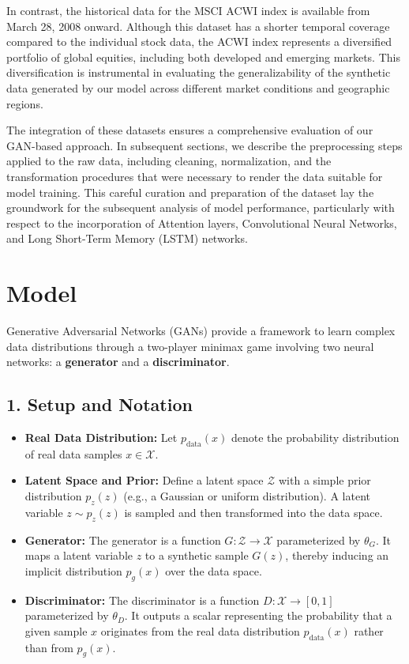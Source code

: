 \documentclass{article}
\begin{document}
In contrast, the historical data for the MSCI ACWI index is available from March 28, 2008 onward. Although this dataset has a shorter temporal coverage compared to the individual stock data, the ACWI index represents a diversified portfolio of global equities, including both developed and emerging markets. This diversification is instrumental in evaluating the generalizability of the synthetic data generated by our model across different market conditions and geographic regions.

The integration of these datasets ensures a comprehensive evaluation of our GAN-based approach. In subsequent sections, we describe the preprocessing steps applied to the raw data, including cleaning, normalization, and the transformation procedures that were necessary to render the data suitable for model training. This careful curation and preparation of the dataset lay the groundwork for the subsequent analysis of model performance, particularly with respect to the incorporation of Attention layers, Convolutional Neural Networks, and Long Short-Term Memory (LSTM) networks.



\section{Model}

Generative Adversarial Networks (GANs) provide a framework to learn complex data distributions through a two-player minimax game involving two neural networks: a \textbf{generator} and a \textbf{discriminator}.

\subsection*{1. Setup and Notation}

\begin{itemize}
    \item \textbf{Real Data Distribution:}
    Let $ p_{\text{data}}(x) $ denote the probability distribution of real data samples $ x \in \mathcal{X} $.

    \item \textbf{Latent Space and Prior:}
    Define a latent space $ \mathcal{Z} $ with a simple prior distribution $ p_z(z) $ (e.g., a Gaussian or uniform distribution). A latent variable $ z \sim p_z(z) $ is sampled and then transformed into the data space.

    \item \textbf{Generator:}
    The generator is a function $ G: \mathcal{Z} \to \mathcal{X} $ parameterized by $ \theta_G $. It maps a latent variable $ z $ to a synthetic sample $ G(z) $, thereby inducing an implicit distribution $ p_g(x) $ over the data space.

    \item \textbf{Discriminator:}
    The discriminator is a function $ D: \mathcal{X} \to [0,1] $ parameterized by $ \theta_D $. It outputs a scalar representing the probability that a given sample $ x $ originates from the real data distribution $ p_{\text{data}}(x) $ rather than from $ p_g(x) $.
\end{itemize}
\end{document}
